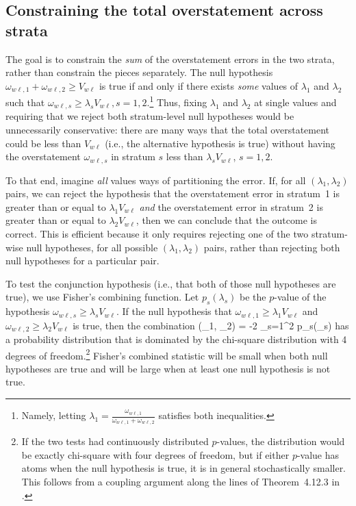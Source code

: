 \subsection{Constraining the total overstatement across strata}
The goal is to constrain the \emph{sum} of the overstatement errors in the two
strata, rather than constrain the pieces separately.
The null hypothesis $\omega_{w\ell, 1} + \omega_{w\ell, 2} \ge V_{w\ell}$ is true if and only if there exists \textit{some}
values of $\lambda_1$ and $\lambda_2$ such that $\omega_{w\ell, s}\ge \lambda_s V_{w\ell}, s=1, 2$.\footnote{
Namely, letting $\lambda_1 = \frac{\omega_{w\ell, 1}}{\omega_{w\ell, 1}+\omega_{w\ell, 2}}$ satisfies both inequalities.
}
Thus, fixing $\lambda_1$ and $\lambda_2$ at single values and requiring that we reject both stratum-level null hypotheses 
would be unnecessarily conservative:
there are many ways that the total overstatement could be less than $V_{w\ell}$ (i.e., the alternative hypothesis is true) without
having the overstatement $\omega_{w\ell,s}$ in stratum $s$ less than $\lambda_s V_{w\ell}$, $s = 1, 2$.

To that end, imagine \emph{all} values ways of partitioning the error.
If, for all $(\lambda_1, \lambda_2)$ pairs, we can reject the hypothesis that the 
overstatement error in stratum~1 is greater than or equal to $\lambda_1 V_{w\ell}$ \emph{and} 
the overstatement error in stratum~2 is greater than or equal to $\lambda_2 V_{w\ell}$, then
we can conclude that the outcome is correct.
This is efficient because it only requires rejecting one of the two stratum-wise null hypotheses,
for all possible $(\lambda_1, \lambda_2)$ pairs,
rather than rejecting both null hypotheses for a particular pair.

To test the conjunction hypothesis (i.e., that both of those null hypotheses are true), we use 
Fisher's combining function.
Let $p_s(\lambda_s)$ be the $p$-value of the hypothesis $\omega_{w\ell,s} \ge \lambda_s V_{w\ell}$.
If the null hypothesis that $\omega_{w\ell,1} \ge \lambda_1 V_{w\ell}$ and 
$\omega_{w\ell,2} \ge \lambda_2 V_{w\ell}$ is true, then the combination
\beq
   \chi(\lambda_1, \lambda_2) = -2 \sum_{s=1}^2 \ln p_s(\lambda_s)
\eeq
has a probability distribution that is dominated by the chi-square distribution with 4 degrees
of freedom.\footnote{%
   If the two tests had continuously distributed $p$-values, the distribution would be exactly
   chi-square with four degrees of freedom, but if either $p$-value has atoms when
   the null hypothesis is true, it is in general stochastically smaller.
   This follows from a coupling argument along the lines of Theorem~4.12.3 in \cite{grimmett01}.
}
Fisher's combined statistic will be small when both null hypotheses are true and will be large when
at least one null hypothesis is not true.

